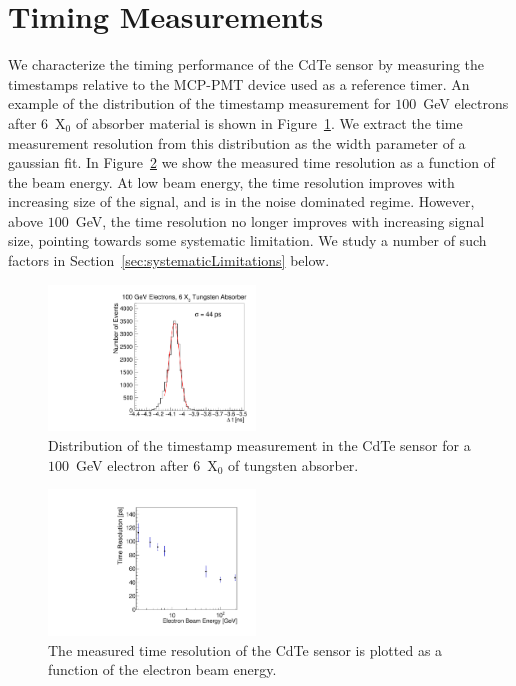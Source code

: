 
\section{Timing Measurements} 
\label{sec:timing} 

We characterize the timing performance of the CdTe sensor by measuring the timestamps
relative to the MCP-PMT device used as a reference timer. An example of the distribution 
of the timestamp measurement for $100$~GeV electrons after $6$~$\mathrm{X}_{0}$ of absorber
material is shown in Figure~\ref{fig:DeltaT}. We extract the time measurement
resolution from this distribution as the width parameter of a gaussian fit.
In Figure~\ref{fig:ChargeVsEnergy} we show the measured time resolution as a function of the
beam energy. At low beam energy, the time resolution improves with increasing size 
of the signal, and is in the noise dominated regime. However, above $100$~GeV, the time 
resolution no longer improves with increasing signal size, pointing towards some
systematic limitation. We study a number of such factors in 
Section~\ref{sec:systematicLimitations} below.

\begin{figure}[htbp] 
\centering
\includegraphics[width=0.49\textwidth]{figures/100GeV_deltaT.pdf} 
\caption{Distribution of the timestamp measurement in the CdTe sensor for a $100$~GeV
electron after $6$~$\mathrm{X}_{0}$ of tungsten absorber. } 
\label{fig:DeltaT} 
\end{figure} 


\begin{figure}[htbp] 
\centering
\includegraphics[width=0.49\textwidth]{figures/TimeResolutionVsEnergy.pdf} 
\caption{ The measured time resolution of the CdTe sensor is plotted as a function
of the electron beam energy. } 
\label{fig:ChargeVsEnergy} 
\end{figure} 


